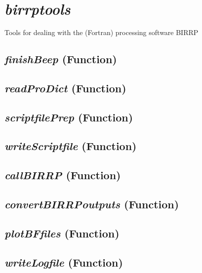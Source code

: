\section{\textit{birrptools} }
\label{sec:processing.birrptools}

Tools for dealing with the (Fortran) processing software BIRRP 

\subsection{\textit{finishBeep} (Function)}
\label{ssec:processing.birrptools.finishBeep}

\subsection{\textit{readProDict} (Function)}
\label{ssec:processing.birrptools.readProDict}

\subsection{\textit{scriptfilePrep} (Function)}
\label{ssec:processing.birrptools.scriptfilePrep}

\subsection{\textit{writeScriptfile} (Function)}
\label{ssec:processing.birrptools.writeScriptfile}

\subsection{\textit{callBIRRP} (Function)}
\label{ssec:processing.birrptools.callBIRRP}

\subsection{\textit{convertBIRRPoutputs} (Function)}
\label{ssec:processing.birrptools.convertBIRRPoutputs}

\subsection{\textit{plotBFfiles} (Function)}
\label{ssec:processing.birrptools.plotBFfiles}

\subsection{\textit{writeLogfile} (Function)}
\label{ssec:processing.birrptools.writeLogfile}

